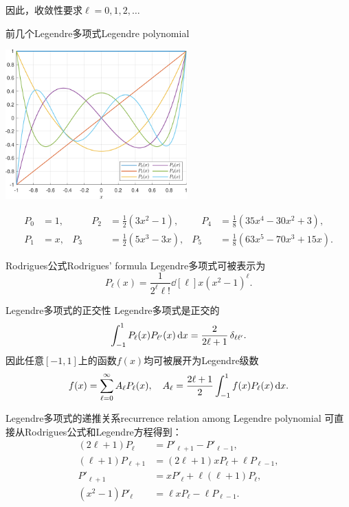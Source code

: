 因此，收敛性要求$\ell=0,1,2,\ldots$
\begin{example}{前几个Legendre多项式}{Legendre polynomial}
    \begin{center}
        \includegraphics[width=7cm]{graphs/Legendre.pdf}
    \end{center}
    \begin{equation*}
        \begin{aligned}
            P_0&=1,&\qquad P_2&=\frac12(3x^2-1),&\quad P_4&=\frac18(35x^4-30x^2+3),\\
            P_1&=x,&P_3&=\frac12(5x^3-3x),&P_5&=\frac18(63x^5-70x^3+15x).
        \end{aligned}
    \end{equation*}
\end{example}
\begin{theorem}{Rodrigues公式}{Rodrigues' formula}
    Legendre多项式可被表示为
    \begin{equation}
        \label{eqn:Rodrigues}
        P_\ell(x)=\frac1{2^\ell\ell!}\dd[\ell]x(x^2-1)^\ell.
    \end{equation}
\end{theorem}
\begin{theorem}
    {Legendre多项式的正交性}{}
    Legendre多项式是正交的
    \[
        \int_{-1}^1P_\ell(x)P_{\ell'}(x)\mathop{}\!\mathrm{d} x=\frac2{2\ell+1}\mathop{}\!\delta_{\ell\ell'}.
    \]
    因此任意$[-1,1]$上的函数$f(x)$均可被展开为Legendre级数
    \[
        f(x)=\sum_{\ell=0}^\infty A_\ell P_\ell(x),\quad A_\ell=\frac{2\ell+1}2\int_{-1}^1f(x)P_\ell(x)\mathop{}\!\mathrm{d} x.
    \]
\end{theorem}
\begin{theorem}{Legendre多项式的递推关系}{recurrence relation among Legendre polynomial}
    可直接从Rodrigues公式和Legendre方程得到：
    \begin{subequations}
        \begin{align}
            \label{eqn:Legendre recurrence 1}
            (2\ell+1)P_\ell&=P'_{\ell+1}-P'_{\ell-1},\\
            (\ell+1)P_{\ell+1}&=(2\ell+1)xP_\ell+\ell P_{\ell-1},\\
            P'_{\ell+1}&=xP'_\ell+\ell(\ell+1)P_\ell,\\
            (x^2-1)P'_\ell&=\ell xP_\ell-\ell P_{\ell-1}.
        \end{align}
    \end{subequations}
\end{theorem}
